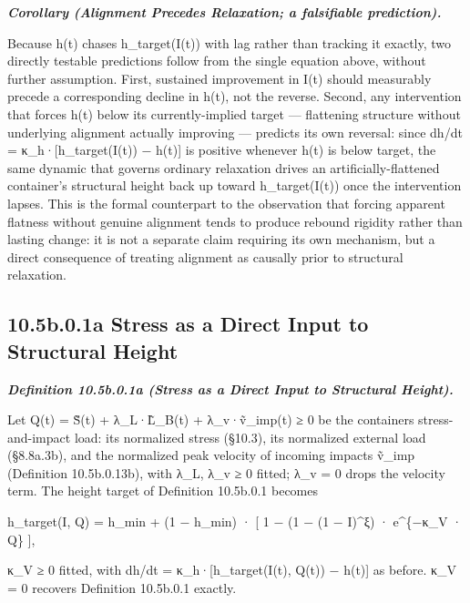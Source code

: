 \documentclass[
]{article}
\begin{document}
\emph{\textbf{Corollary (Alignment Precedes Relaxation; a falsifiable
prediction).}}

Because h(t) chases h\_target(I(t)) with lag rather than tracking it
exactly, two directly testable predictions follow from the single
equation above, without further assumption. First, sustained improvement
in I(t) should measurably precede a corresponding decline in h(t), not
the reverse. Second, any intervention that forces h(t) below its
currently-implied target --- flattening structure without underlying
alignment actually improving --- predicts its own reversal: since dh/dt
= κ\_h·{[}h\_target(I(t)) − h(t){]} is positive whenever h(t) is below
target, the same dynamic that governs ordinary relaxation drives an
artificially-flattened container's structural height back up toward
h\_target(I(t)) once the intervention lapses. This is the formal
counterpart to the observation that forcing apparent flatness without
genuine alignment tends to produce rebound rigidity rather than lasting
change: it is not a separate claim requiring its own mechanism, but a
direct consequence of treating alignment as causally prior to structural
relaxation.

\hypertarget{b.0.1a-stress-as-a-direct-input-to-structural-height}{%
\subsection{10.5b.0.1a Stress as a Direct Input to Structural
Height}\label{b.0.1a-stress-as-a-direct-input-to-structural-height}}

\emph{\textbf{Definition 10.5b.0.1a (Stress as a Direct Input to
Structural Height).}}

Let Q(t) = S̃(t) + λ\_L·L̃\_B(t) + λ\_v·ṽ\_imp(t) ≥ 0 be the
container\textquotesingle s stress-and-impact load: its normalized
stress (§10.3), its normalized external load (§8.8a.3b), and the
normalized peak velocity of incoming impacts ṽ\_imp (Definition
10.5b.0.13b), with λ\_L, λ\_v ≥ 0 fitted; λ\_v = 0 drops the velocity
term. The height target of Definition 10.5b.0.1 becomes

h\_target(I, Q) = h\_min + (1 − h\_min) · {[} 1 − (1 − (1 − I)\^{}ξ) ·
e\^{}\{−κ\_V · Q\} {]},

κ\_V ≥ 0 fitted, with dh/dt = κ\_h·{[}h\_target(I(t), Q(t)) − h(t){]} as
before. κ\_V = 0 recovers Definition 10.5b.0.1 exactly.
\end{document}
